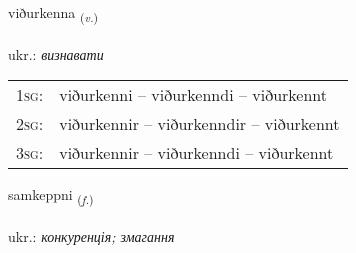 \documentclass[frontgrid, backgrid]{flacards}\usepackage[]{graphicx}\usepackage[]{xcolor}
\begin{document}
\renewcommand{\flhead}{\vskip5pt \fboxsep=0pt {\small\bfseries\footnotesize Sagnorð | дієслово}}
\renewcommand{\fcfoot}{\vskip5pt \fboxsep=0pt \hspace{2pt}{\small\bfseries\footnotesize 1K}}

\renewcommand{\blhead}{\vskip5pt {\small\bfseries\footnotesize Sagnorð | дієслово }}
\renewcommand{\bcfoot}{\vskip5pt \hspace{2pt}{\small\bfseries\footnotesize 1K}}


{viðurkenna \small{\textsubscript{(\textit{v.})}} \\[1ex] %
 \\
ukr.: \emph{визнавати} \\  [2ex]
\renewcommand*{\arraystretch}{0.8}
\begin{tabular}{p{1cm}l}
\textsc{1sg}: & viðurkenni -- viðurkenndi -- viðurkennt \\ 
\textsc{2sg}: & viðurkennir -- viðurkenndir -- viðurkennt \\ 
\textsc{3sg}: & viðurkennir -- viðurkenndi -- viðurkennt \\ 
\end{tabular}
}

\renewcommand{\flhead}{\vskip5pt \fboxsep=0pt {\small\bfseries\footnotesize Nafnorð | іменник}}
\renewcommand{\fcfoot}{\vskip5pt \fboxsep=0pt \hspace{2pt}{\small\bfseries\footnotesize 1K}}

\renewcommand{\blhead}{\vskip5pt {\small\bfseries\footnotesize Nafnorð | іменник }}
\renewcommand{\bcfoot}{\vskip5pt \hspace{2pt}{\small\bfseries\footnotesize 1K}}


{samkeppni \small{\textsubscript{(\textit{f.})}} \\[1ex] %
\textphonetic{[samcʰɛhpnɪ]} \\
ukr.: \emph{конкуренція; змагання} \\  [2ex]
\renewcommand*{\arraystretch}{0.8}
}
\end{document}
